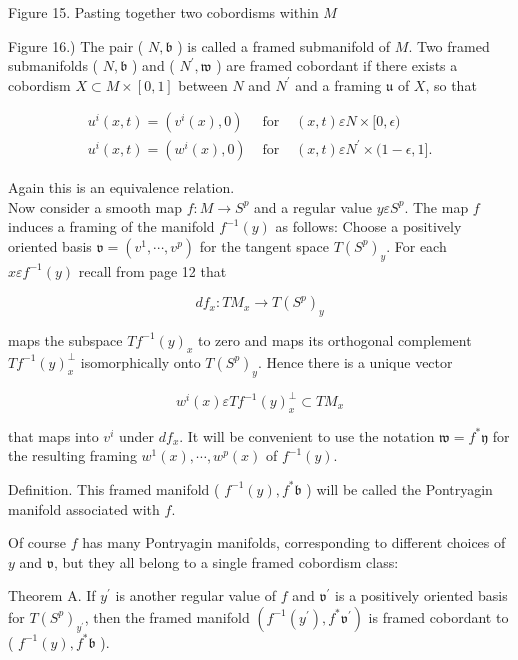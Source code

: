 \documentclass[10pt, letterpaper]{article}
\begin{document}
Figure 15. Pasting together two cobordisms within $M$

Figure 16.) The pair ( $N, \mathfrak{b}$ ) is called a framed submanifold of $M$. Two framed submanifolds ( $N, \mathfrak{b}$ ) and ( $N^{\prime}, \mathfrak{w}$ ) are framed cobordant if there exists a cobordism $X \subset M \times[0,1]$ between $N$ and $N^{\prime}$ and a framing $\mathfrak{u}$ of $X$, so that

$$
\begin{array}{cll}
u^{i}(x, t)=\left(v^{i}(x), 0\right) & \text { for } & (x, t) \varepsilon N \times[0, \epsilon) \\
u^{i}(x, t)=\left(w^{i}(x), 0\right) & \text { for } & (x, t) \varepsilon N^{\prime} \times(1-\epsilon, 1] .
\end{array}
$$

Again this is an equivalence relation.\\
Now consider a smooth map $f: M \rightarrow S^{p}$ and a regular value $y \varepsilon S^{p}$. The map $f$ induces a framing of the manifold $f^{-1}(y)$ as follows: Choose a positively oriented basis $\mathfrak{v}=\left(v^{1}, \cdots, v^{p}\right)$ for the tangent space $T\left(S^{p}\right)_{y}$. For each $x \varepsilon f^{-1}(y)$ recall from page 12 that

$$
d f_{x}: T M_{x} \rightarrow T\left(S^{p}\right)_{y}
$$

maps the subspace $T f^{-1}(y)_{x}$ to zero and maps its orthogonal complement $T f^{-1}(y)_{x}^{\perp}$ isomorphically onto $T\left(S^{p}\right)_{y}$. Hence there is a unique vector

$$
w^{i}(x) \varepsilon T f^{-1}(y)_{x}^{\perp} \subset T M_{x}
$$

that maps into $v^{i}$ under $d f_{x}$. It will be convenient to use the notation $\mathfrak{w}=f^{*} \mathfrak{y}$ for the resulting framing $w^{1}(x), \cdots, w^{p}(x)$ of $f^{-1}(y)$.

Definition. This framed manifold ( $f^{-1}(y), f^{*} \mathfrak{b}$ ) will be called the Pontryagin manifold associated with $f$.

Of course $f$ has many Pontryagin manifolds, corresponding to different choices of $y$ and $\mathfrak{v}$, but they all belong to a single framed cobordism class:

Theorem A. If $y^{\prime}$ is another regular value of $f$ and $\mathfrak{v}^{\prime}$ is a positively oriented basis for $T\left(S^{p}\right)_{y^{\prime}}$, then the framed manifold $\left(f^{-1}\left(y^{\prime}\right), f^{*} \mathfrak{v}^{\prime}\right)$ is framed cobordant to ( $f^{-1}(y), f^{*} \mathfrak{b}$ ).
\end{document}
